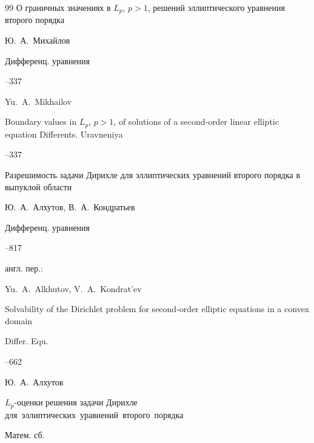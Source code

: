 \begin{thebibliography}{99}
\paper О граничных значениях в $L_p$, $p>1$, решений эллиптического уравнения второго порядка

\by Ю.~А.~Михайлов

\jour Дифференц. уравнения




--337

\misctransl

\by Yu.~A.~Mikhailov

\paper  Boundary values in $L_p$, $p>1$, of solutions of a second-order linear elliptic equation \jour Differents. Uravneniya 




–337



\pagebreak




\paper Разрешимость задачи Дирихле для эллиптических уравнений второго порядка в выпуклой области

\by Ю.~А.~Алхутов, В.~А.~Кондратьев

\jour Дифференц. уравнения




--817

\transl англ. пер.:~

\by Yu.~A.~Alkhutov, V.~A.~Kondrat'ev

\paper Solvability of the Dirichlet problem for second-order elliptic equations in a convex domain

\jour Differ. Equ. 




–662 






\by Ю.~А.~Алхутов

\paper $L_p$-оценки решения задачи Дирихле для~эллиптических~уравнений~второго~порядка

\jour Матем. сб.



\end{thebibliography}

